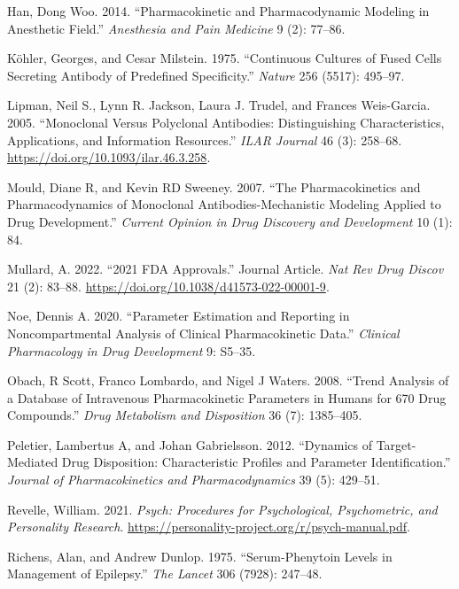 \documentclass[
  11pt,
  krantz2, a4paper, twoside]{krantz}
\newlength{\cslhangindent}
\newenvironment{CSLReferences}[2] %
 {\begin{list}{}{%
  \setlength{\itemindent}{0pt}
  \setlength{\leftmargin}{0pt}
  \setlength{\parsep}{0pt}
  \ifodd #1
   \setlength{\leftmargin}{\cslhangindent}
   \setlength{\itemindent}{-1\cslhangindent}
  \fi
  \setlength{\itemsep}{#2\baselineskip}}}
 {\end{list}}
\theoremstyle{definition}
\theoremstyle{definition}
\theoremstyle{definition}
\theoremstyle{definition}
\theoremstyle{remark}
\begin{document}
\begin{CSLReferences}{1}{0}
Han, Dong Woo. 2014. {``Pharmacokinetic and Pharmacodynamic Modeling in Anesthetic Field.''} \emph{Anesthesia and Pain Medicine} 9 (2): 77--86.

Köhler, Georges, and Cesar Milstein. 1975. {``Continuous Cultures of Fused Cells Secreting Antibody of Predefined Specificity.''} \emph{Nature} 256 (5517): 495--97.

Lipman, Neil S., Lynn R. Jackson, Laura J. Trudel, and Frances Weis-Garcia. 2005. {``{Monoclonal Versus Polyclonal Antibodies: Distinguishing Characteristics, Applications, and Information Resources}.''} \emph{ILAR Journal} 46 (3): 258--68. \url{https://doi.org/10.1093/ilar.46.3.258}.

Mould, Diane R, and Kevin RD Sweeney. 2007. {``The Pharmacokinetics and Pharmacodynamics of Monoclonal Antibodies-Mechanistic Modeling Applied to Drug Development.''} \emph{Current Opinion in Drug Discovery and Development} 10 (1): 84.

Mullard, A. 2022. {``2021 FDA Approvals.''} Journal Article. \emph{Nat Rev Drug Discov} 21 (2): 83--88. \url{https://doi.org/10.1038/d41573-022-00001-9}.

Noe, Dennis A. 2020. {``Parameter Estimation and Reporting in Noncompartmental Analysis of Clinical Pharmacokinetic Data.''} \emph{Clinical Pharmacology in Drug Development} 9: S5--35.

Obach, R Scott, Franco Lombardo, and Nigel J Waters. 2008. {``Trend Analysis of a Database of Intravenous Pharmacokinetic Parameters in Humans for 670 Drug Compounds.''} \emph{Drug Metabolism and Disposition} 36 (7): 1385--405.

Peletier, Lambertus A, and Johan Gabrielsson. 2012. {``Dynamics of Target-Mediated Drug Disposition: Characteristic Profiles and Parameter Identification.''} \emph{Journal of Pharmacokinetics and Pharmacodynamics} 39 (5): 429--51.

Revelle, William. 2021. \emph{Psych: Procedures for Psychological, Psychometric, and Personality Research}. \url{https://personality-project.org/r/psych-manual.pdf}.

Richens, Alan, and Andrew Dunlop. 1975. {``Serum-Phenytoin Levels in Management of Epilepsy.''} \emph{The Lancet} 306 (7928): 247--48.


\end{CSLReferences}
\end{document}
